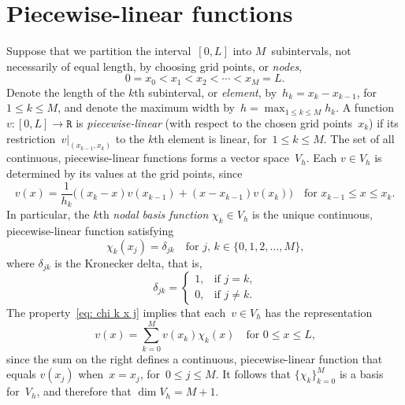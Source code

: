 \section{Piecewise-linear functions}
Suppose that we partition the interval~$[0,L]$ into $M$~subintervals, not 
necessarily of equal length, by choosing grid points, or \emph{nodes},
\begin{equation}\label{eq: 1d nodes}
0=x_0<x_1<x_2<\cdots<x_M=L.
\end{equation}
Denote the length of the $k$th subinterval, or \emph{element}, 
by~$h_k=x_k-x_{k-1}$, for~$1\le k\le M$, and denote the maximum width 
by~$h=\max_{1\le k\le M}h_k$.  A function $v:[0,L]\to\mathtt{R}$ is 
\emph{piecewise-linear} (with respect to the chosen grid points~$x_k$) if its 
restriction~$v|_{(x_{k-1},x_k)}$ to the $k$th element is linear, for~$1\le k\le 
M$.  The set of all continuous, piecewise-linear functions forms a vector 
space~$V_h$.  Each $v\in V_h$ is determined by its values at the grid points, 
since
\[
v(x)=\frac{1}{h_k}\bigl((x_k-x)v(x_{k-1})+(x-x_{k-1})v(x_k)\bigr)
    \quad\text{for $x_{k-1}\le x\le x_k$.}
\]
In particular, the $k$th \emph{nodal basis function} $\chi_k\in V_h$ is the 
unique continuous, piecewise-linear function satisfying
\begin{equation}\label{eq: chi k x j}
\chi_k(x_j)=\delta_{jk}\quad\text{for $j$, $k\in\{0, 1, 2, \ldots, M\}$,}
\end{equation}
where $\delta_{jk}$ is the Kronecker delta, that is,
\[
\delta_{jk}=\begin{cases}
1,&\text{if $j=k$,}\\ 0,&\text{if $j\ne k$.} 
\end{cases}
\]
The property~\eqref{eq: chi k x j} implies that each~$v\in V_h$ has the 
representation
\[
v(x)=\sum_{k=0}^M v(x_k)\chi_k(x)\quad\text{for $0\le x\le L$,}
\]
since the sum on the right defines a continuous, piecewise-linear function that 
equals $v(x_j)$ when~$x=x_j$, for~$0\le j\le M$.  It follows that 
$\{\chi_k\}_{k=0}^M$ is a basis for~$V_h$, and therefore that $\dim V_h=M+1$.


